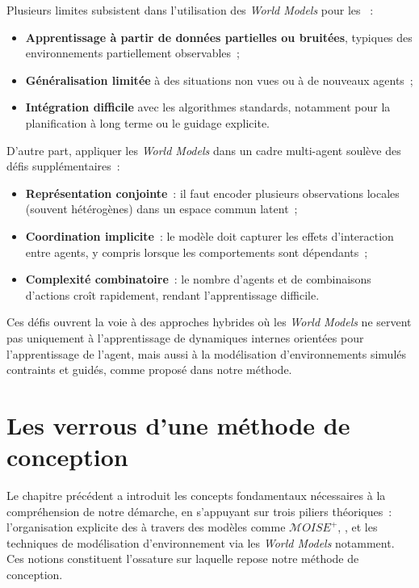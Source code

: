 Plusieurs limites subsistent dans l'utilisation des \textit{World Models} pour les ~:
\begin{itemize}
  \item \textbf{Apprentissage à partir de données partielles ou bruitées}, typiques des environnements partiellement observables~;
  \item \textbf{Généralisation limitée} à des situations non vues ou à de nouveaux agents~;
  \item \textbf{Intégration difficile} avec les algorithmes  standards, notamment pour la planification à long terme ou le guidage explicite.
\end{itemize}

D'autre part, appliquer les \textit{World Models} dans un cadre multi-agent soulève des défis supplémentaires~:
\begin{itemize}
  \item \textbf{Représentation conjointe}~: il faut encoder plusieurs observations locales (souvent hétérogènes) dans un espace commun latent~;
  \item \textbf{Coordination implicite}~: le modèle doit capturer les effets d'interaction entre agents, y compris lorsque les comportements sont dépendants~;
  \item \textbf{Complexité combinatoire}~: le nombre d'agents et de combinaisons d'actions croît rapidement, rendant l'apprentissage difficile.
\end{itemize}

Ces défis ouvrent la voie à des approches hybrides où les \textit{World Models} ne servent pas uniquement à l'apprentissage de dynamiques internes orientées pour l'apprentissage de l'agent, mais aussi à la modélisation d'environnements simulés contraints et guidés, comme proposé dans notre méthode.


\chapter{Les verrous d'une méthode de conception}
\label{chap:verrous}

\noindent
Le chapitre précédent a introduit les concepts fondamentaux nécessaires à la compréhension de notre démarche, en s'appuyant sur trois piliers théoriques~: l'organisation explicite des  à travers des modèles comme \textit{$\mathcal{M}OISE^+$}, , et les techniques de modélisation d'environnement via les \textit{World Models} notamment. Ces notions constituent l'ossature sur laquelle repose notre méthode de conception.

